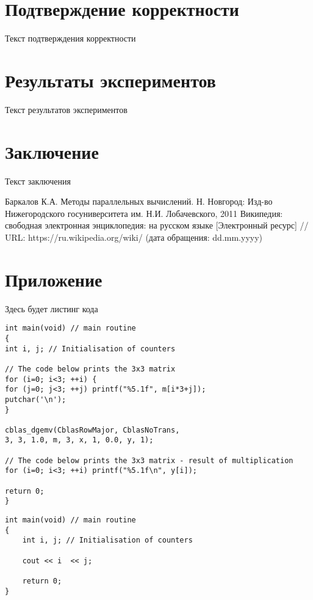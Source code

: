 \documentclass{report}
\begin{document}
\newpage

\section*{Подтверждение корректности}
Текст подтверждения корректности
\newpage

\section*{Результаты экспериментов}
Текст результатов экспериментов
\newpage

\section*{Заключение}
Текст заключения
\newpage

\begin{thebibliography}{1}
 Баркалов К.А. Методы параллельных вычислений. Н. Новгород: Изд-во Нижегородского госуниверситета им. Н.И. Лобачевского, 2011
 Википедия: свободная электронная энциклопедия: на русском языке [Электронный ресурс] // URL: https://ru.wikipedia.org/wiki/ (дата обращения: dd.mm.yyyy)
\end{thebibliography}
\newpage

\section*{Приложение}
Здесь будет листинг кода

\begin{lstlisting}[label=testl,caption=Test]
int main(void) // main routine
{
int i, j; // Initialisation of counters

// The code below prints the 3x3 matrix
for (i=0; i<3; ++i) {
for (j=0; j<3; ++j) printf("%5.1f", m[i*3+j]);
putchar('\n');
}

cblas_dgemv(CblasRowMajor, CblasNoTrans,
3, 3, 1.0, m, 3, x, 1, 0.0, y, 1);

// The code below prints the 3x3 matrix - result of multiplication
for (i=0; i<3; ++i) printf("%5.1f\n", y[i]);

return 0;
}
\end{lstlisting}

\begin{lstlisting}[label=test2,caption=Test2]
int main(void) // main routine
{
	int i, j; // Initialisation of counters

	cout << i  << j;

	return 0;
}
\end{lstlisting}
\end{document}
